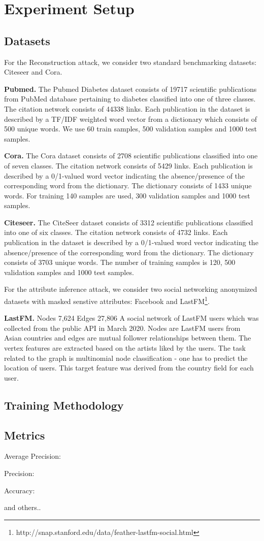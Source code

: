 \section{Experiment Setup}


\subsection{Datasets}

For the Reconstruction attack, we consider two standard benchmarking datasets: Citeseer and Cora.

\noindent\textbf{Pubmed.} The Pubmed Diabetes dataset consists of 19717 scientific publications from PubMed database pertaining to diabetes classified into one of three classes. The citation network consists of 44338 links. Each publication in the dataset is described by a TF/IDF weighted word vector from a dictionary which consists of 500 unique words.
We use 60 train samples, 500 validation samples and 1000 test samples.


\noindent\textbf{Cora.} The Cora dataset consists of 2708 scientific publications classified into one of seven classes.
The citation network consists of 5429 links. Each publication is described by a 0/1-valued word vector indicating the absence/presence of the corresponding word from the dictionary.
The dictionary consists of 1433 unique words.
For training 140 samples are used, 300 validation samples and 1000 test samples.

\noindent\textbf{Citeseer.} The CiteSeer dataset consists of 3312 scientific publications classified into one of six classes.
The citation network consists of 4732 links. Each publication in the dataset is described by a 0/1-valued word vector indicating the absence/presence of the corresponding word from the dictionary.
The dictionary consists of 3703 unique words.
The number of training samples is 120, 500 validation samples and 1000 test samples.

For the attribute inference attack, we consider two social networking anonymized datasets with masked senstive attributes: Facebook and LastFM\footnote{http://snap.stanford.edu/data/feather-lastfm-social.html}.


\noindent\textbf{LastFM.} Nodes 7,624
Edges 27,806 A social network of LastFM users which was collected from the public API in March 2020. Nodes are LastFM users from Asian countries and edges are mutual follower relationships between them. The vertex features are extracted based on the artists liked by the users. The task related to the graph is multinomial node classification - one has to predict the location of users. This target feature was derived from the country field for each user.



\subsection{Training Methodology}


\subsection{Metrics}

Average Precision:

Precision:

Accuracy:

and others..
